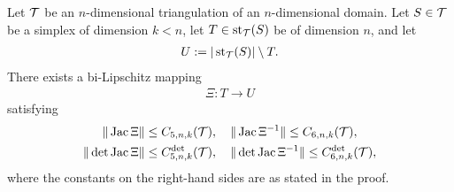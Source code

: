 \documentclass[10pt,letterpaper]{article}
\begin{document}
\begin{theorem}\label{theorem:starreflection}
    Let ${\mathcal T}$ be an $n$-dimensional triangulation of an $n$-dimensional domain. 
    Let $S \in {\mathcal T}$ be a simplex of dimension $k < n$,
    let $T \in \operatorname{st}_{{\mathcal T}}(S)$ be of dimension $n$,
    and let 
    \begin{align*}
        U := |\operatorname{st}_{{\mathcal T}}(S)| \setminus T.
    \end{align*}
    There exists a bi-Lipschitz mapping
    \begin{align*}
        \Xi : T \rightarrow U
    \end{align*}
    satisfying
    \begin{gather*}
        \| \operatorname{{\rm Jac}}\Xi \|          \leq C_{5,n,k}({\mathcal T}),
        \quad 
        \| \operatorname{{\rm Jac}}\Xi^{-1} \|     \leq C_{6,n,k}({\mathcal T}),
        \\
        \| \det\operatorname{{\rm Jac}}\Xi \|      \leq C^{\det}_{5,n,k}({\mathcal T}),
        \quad 
        \| \det\operatorname{{\rm Jac}}\Xi^{-1} \| \leq C^{\det}_{6,n,k}({\mathcal T}),
    \end{gather*}
    where the constants on the right-hand sides are as stated in the proof. 
\end{theorem}
\end{document}
